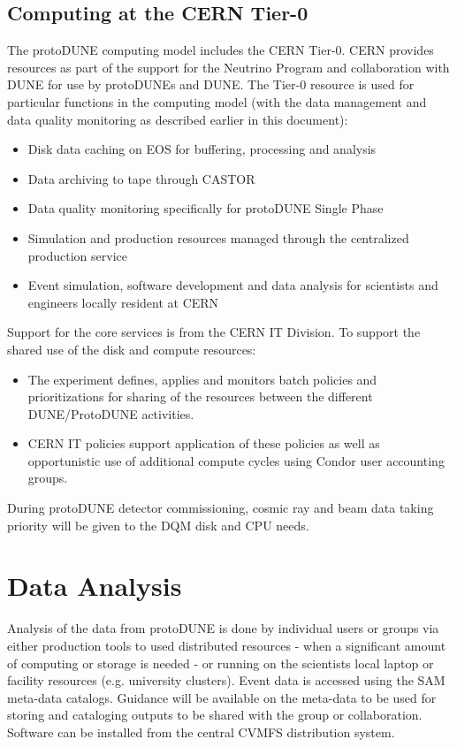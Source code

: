 \documentclass[12pt]{article}
\begin{document}
\subsection{Computing at the CERN Tier-0}

The protoDUNE computing model includes the CERN Tier-0. CERN provides resources as part of the support for the Neutrino Program and collaboration with DUNE for use by protoDUNEs and DUNE. The Tier-0 resource is used for particular functions in the computing model (with the data management and data quality monitoring as described earlier in this document):
\begin{itemize}
\item Disk data caching on EOS for buffering, processing and analysis
\item Data archiving to tape through CASTOR
\item Data quality monitoring specifically for protoDUNE Single Phase  
\item Simulation and production resources managed through the centralized production service
\item Event simulation, software development and data analysis for scientists and engineers locally resident at CERN
\end{itemize}
Support for the core services is from the CERN IT Division.  To support the shared use of the disk and compute resources: 
\begin{itemize}
\item The experiment defines, applies and monitors batch policies and prioritizations for sharing of the resources between the different DUNE/ProtoDUNE activities. 
\item CERN IT policies support application of these policies as well as opportunistic use of additional compute cycles using Condor user accounting groups. 
\end{itemize}
During protoDUNE detector commissioning, cosmic ray and beam data taking priority will be given to the DQM disk and CPU needs.  

\section{Data Analysis}
Analysis of the data from protoDUNE is done by individual users or groups via either production tools to used distributed resources - when a significant amount of computing or storage is needed - or running on the scientists local laptop or facility resources (e.g. university clusters). Event data is accessed using the SAM meta-data catalogs. Guidance will be available on the meta-data to be used for storing and cataloging outputs to be shared with the group or collaboration. Software can be installed from the central CVMFS distribution system.  
\end{document}
